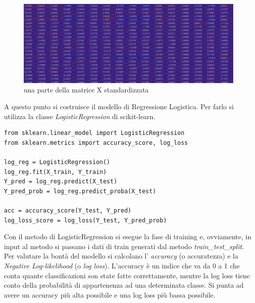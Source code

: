 \begin{figure}[h]
	\centering   	
	\includegraphics[width=140mm]{image/standardX.png}
	\caption{una parte della matrice X standardizzata}
\end{figure}
A questo punto si costruisce il modello di Regressione Logistica. Per farlo si utilizza la classe \textit{LogisticRegression} di scikit-learn.
\begin{lstlisting}
from sklearn.linear_model import LogisticRegression
from sklearn.metrics import accuracy_score, log_loss

log_reg = LogisticRegression()
log_reg.fit(X_train, Y_train)
Y_pred = log_reg.predict(X_test)
Y_pred_prob = log_reg.predict_proba(X_test)

acc = accuracy_score(Y_test, Y_pred)
log_loss_score = log_loss(Y_test, Y_pred_prob)
\end{lstlisting}
Con il metodo  di LogisticRegression si esegue la fase di training e, ovviamente, in input al metodo si passano i dati di train generati dal metodo \textit{train\_test\_split}.\\
Per valutare la bontà del modello si calcolano l' \textit{accuracy} (o accuratezza) e la \textit{Negative Log-likelihood} (o \textit{log loss}). L'accuracy è un indice che va da 0 a 1 che conta quante classificazioni son state fatte correttamente, mentre la log loss tiene conto della probabilità di appartenenza ad una determinata classe. Si punta ad avere un accuracy più alta possibile e una log loss più bassa possibile.

